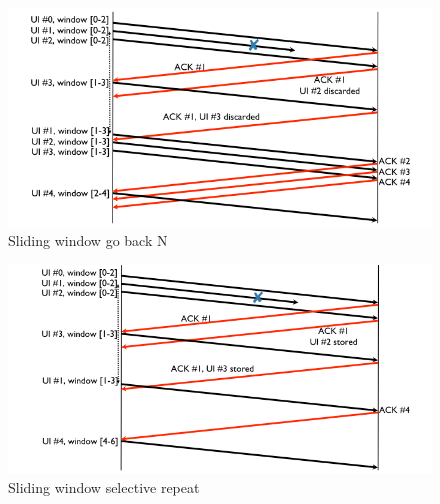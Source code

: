 \begin{figure}[!ht]
	\centering
	\includegraphics[width=0.4\columnwidth]{./images/sliding_window_go_back_n.png}
  \caption{Sliding window go back N}
  \label{fig:sliding_window_go_back_n}
\end{figure}

\begin{figure}[!ht]
	\centering
	\includegraphics[width=0.4\columnwidth]{./images/sliding_window_selective_repeat.png}
  \caption{Sliding window selective repeat}
  \label{fig:sliding_window_selective_repeat}
\end{figure}



